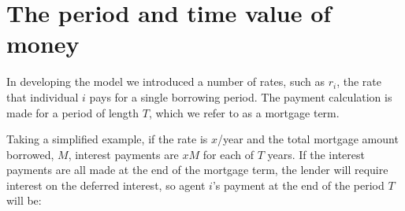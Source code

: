 


\section{The period and time value of money}
In developing the model we introduced a number of rates, such as $r_i$, the rate that individual $i$ pays for a single borrowing period. The payment calculation is made for a period of length $T$, which we refer to as a mortgage term.

Taking a simplified example, if the rate is $x$/year  and  the total mortgage amount borrowed, $M$, interest payments are $xM$  for each of $T$ years. 
If the interest payments are all made at the end of the mortgage term, the lender will require interest on the deferred interest, so agent $i$'s payment at the end of the period $T$ will be:

